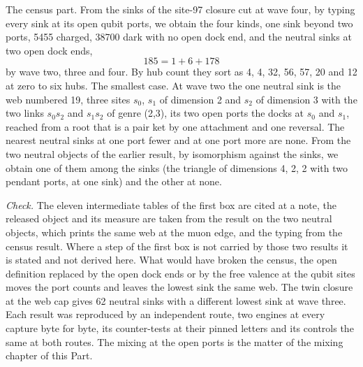 \begin{chproof}[exact]
The census part. From the sinks of the site-97 closure cut at wave four, by typing every sink at its open qubit ports, we obtain the four kinds, one sink beyond two ports, 5455 charged, 38700 dark with no open dock end, and the neutral sinks at two open dock ends,
\begin{equation}
185 = 1 + 6 + 178
\end{equation}
by wave two, three and four. By hub count they sort as 4, 4, 32, 56, 57, 20 and 12 at zero to six hubs. The smallest case. At wave two the one neutral sink is the web numbered 19, three sites $s_0$, $s_1$ of dimension 2 and $s_2$ of dimension 3 with the two links $s_0 s_2$ and $s_1 s_2$ of genre (2,3), its two open ports the docks at $s_0$ and $s_1$, reached from a root that is a pair ket by one attachment and one reversal. The nearest neutral sinks at one port fewer and at one port more are none. From the two neutral objects of the earlier result, by isomorphism against the sinks, we obtain one of them among the sinks (the triangle of dimensions 4, 2, 2 with two pendant ports, at one sink) and the other at none.

\emph{Check.} The eleven intermediate tables of the first box are cited at a note, the released object and its measure are taken from the result on the two neutral objects, which prints the same web at the muon edge, and the typing from the census result. Where a step of the first box is not carried by those two results it is stated and not derived here. What would have broken the census, the open definition replaced by the open dock ends or by the free valence at the qubit sites moves the port counts and leaves the lowest sink the same web. The twin closure at the web cap gives 62 neutral sinks with a different lowest sink at wave three. Each result was reproduced by an independent route, two engines at every capture byte for byte, its counter-tests at their pinned letters and its controls the same at both routes.
The mixing at the open ports is the matter of the mixing chapter of this Part.
\end{chproof}
\label{chend:VI-2b-neutral-lepton-the-hub-unit-with-its-legs-open}
\par\medskip{}\label{narr:close:6-2b}\par
